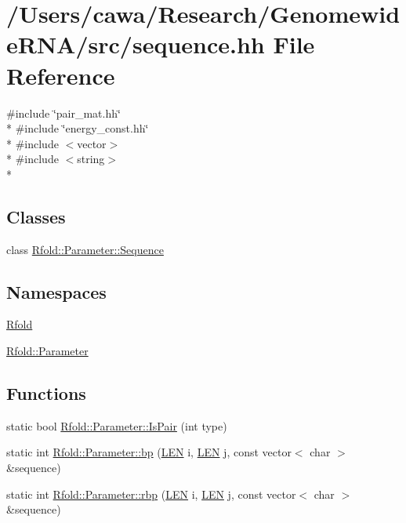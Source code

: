 \hypertarget{sequence_8hh}{\section{/\+Users/cawa/\+Research/\+Genomewide\+R\+N\+A/src/sequence.hh File Reference}
\label{sequence_8hh}
}
{\ttfamily \#include \char`\"{}pair\+\_\+mat.\+hh\char`\"{}}\\*
{\ttfamily \#include \char`\"{}energy\+\_\+const.\+hh\char`\"{}}\\*
{\ttfamily \#include $<$vector$>$}\\*
{\ttfamily \#include $<$string$>$}\\*
\subsection*{Classes}
\begin{DoxyCompactItemize}
\item 
class \hyperlink{class_rfold_1_1_parameter_1_1_sequence}{Rfold\+::\+Parameter\+::\+Sequence}
\end{DoxyCompactItemize}
\subsection*{Namespaces}
\begin{DoxyCompactItemize}
\item 
 \hyperlink{namespace_rfold}{Rfold}
\item 
 \hyperlink{namespace_rfold_1_1_parameter}{Rfold\+::\+Parameter}
\end{DoxyCompactItemize}
\subsection*{Functions}
\begin{DoxyCompactItemize}
\item 
static bool \hyperlink{namespace_rfold_1_1_parameter_ac79332af130ad1da3bb3bbd6008bca00}{Rfold\+::\+Parameter\+::\+Is\+Pair} (int type)
\item 
static int \hyperlink{namespace_rfold_1_1_parameter_a84c9aba4d96ad6776c066fdc8a05497f}{Rfold\+::\+Parameter\+::bp} (\hyperlink{energy__const_8hh_a05b49c662c073f89e86804f7856622a0}{L\+E\+N} i, \hyperlink{energy__const_8hh_a05b49c662c073f89e86804f7856622a0}{L\+E\+N} j, const vector$<$ char $>$ \&sequence)
\item 
static int \hyperlink{namespace_rfold_1_1_parameter_aec0b5515ac41c13814b1af83a843b408}{Rfold\+::\+Parameter\+::rbp} (\hyperlink{energy__const_8hh_a05b49c662c073f89e86804f7856622a0}{L\+E\+N} i, \hyperlink{energy__const_8hh_a05b49c662c073f89e86804f7856622a0}{L\+E\+N} j, const vector$<$ char $>$ \&sequence)
\end{DoxyCompactItemize}
